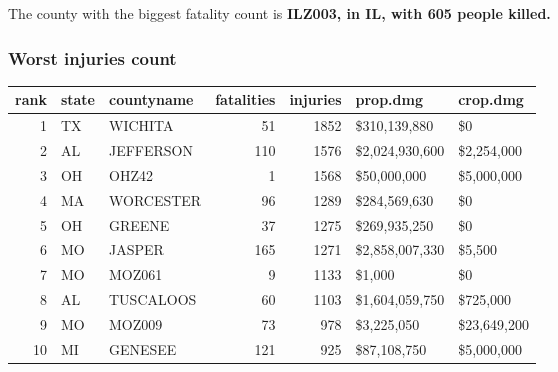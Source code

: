 \documentclass[]{article}
\newenvironment{Shaded}{\begin{snugshade}}{\end{snugshade}}
\newcommand{\KeywordTok}[1]{\textcolor[rgb]{0.13,0.29,0.53}{\textbf{{#1}}}}
\newcommand{\DataTypeTok}[1]{\textcolor[rgb]{0.13,0.29,0.53}{{#1}}}
\newcommand{\DecValTok}[1]{\textcolor[rgb]{0.00,0.00,0.81}{{#1}}}
\newcommand{\StringTok}[1]{\textcolor[rgb]{0.31,0.60,0.02}{{#1}}}
\newcommand{\CommentTok}[1]{\textcolor[rgb]{0.56,0.35,0.01}{\textit{{#1}}}}
\newcommand{\NormalTok}[1]{{#1}}
\begin{document}
The county with the biggest fatality count is \textbf{ILZ003, in IL,
with 605 people killed.}

\subsubsection{Worst injuries count}\label{worst-injuries-count}

\begin{Shaded}
\end{Shaded}

\begin{longtable}[]{@{}rllrrll@{}}
\toprule
rank & state & countyname & fatalities & injuries & prop.dmg &
crop.dmg\tabularnewline
\midrule
\endhead
1 & TX & WICHITA & 51 & 1852 & \$310,139,880 & \$0\tabularnewline
2 & AL & JEFFERSON & 110 & 1576 & \$2,024,930,600 &
\$2,254,000\tabularnewline
3 & OH & OHZ42 & 1 & 1568 & \$50,000,000 & \$5,000,000\tabularnewline
4 & MA & WORCESTER & 96 & 1289 & \$284,569,630 & \$0\tabularnewline
5 & OH & GREENE & 37 & 1275 & \$269,935,250 & \$0\tabularnewline
6 & MO & JASPER & 165 & 1271 & \$2,858,007,330 & \$5,500\tabularnewline
7 & MO & MOZ061 & 9 & 1133 & \$1,000 & \$0\tabularnewline
8 & AL & TUSCALOOS & 60 & 1103 & \$1,604,059,750 &
\$725,000\tabularnewline
9 & MO & MOZ009 & 73 & 978 & \$3,225,050 & \$23,649,200\tabularnewline
10 & MI & GENESEE & 121 & 925 & \$87,108,750 &
\$5,000,000\tabularnewline
\bottomrule
\end{longtable}

\begin{Shaded}
\end{Shaded}
\end{document}
